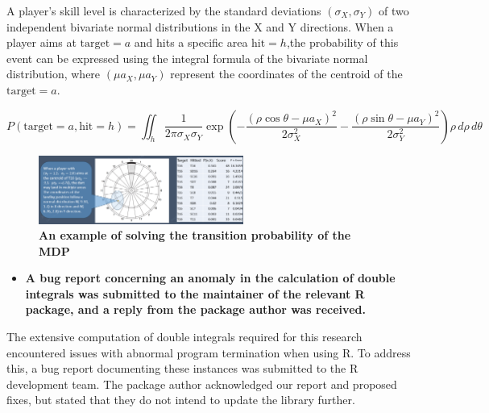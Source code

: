 \documentclass[cjjs]{ipart}
\theoremstyle{plain}
\begin{document}
\text A player's skill level is characterized by the standard deviations
$(\sigma_X, \sigma_Y)$ of two independent bivariate normal distributions in the X and Y directions. When a player aims at ${\text{target}} = a$ and hits a specific area $\text{hit} = h$,the probability of this event can be expressed using the integral formula of the bivariate normal distribution, where $(\mu a_X, \mu a_Y)$ represent the coordinates of the centroid of the $\text{target} = a$.

$$P(\text{target} = a, \text{hit} = h) = \iint_h \frac{1}{2 \pi \sigma_X \sigma_Y} \exp\left( - \frac{(\rho \cos \theta - \mu a_X)^2}{2 \sigma_X^2} - \frac{(\rho \sin \theta - \mu a_Y)^2}{2 \sigma_Y^2} \right) \rho \, d\rho \, d\theta$$

\begin{figure}[H]
    \centering
    \includegraphics[width=0.60\textwidth]{10.png} 
    \caption{\textbf{An example of solving the transition probability
of the MDP}}
    \label{fig:dartboard}
\end{figure}

\begin{itemize}
    \item \textbf{A bug report concerning an anomaly in the calculation of double integrals was submitted to the maintainer of the relevant R package, and a reply from the package author was received.}
\end{itemize}

\text The extensive computation of double integrals required for this research encountered issues with abnormal program termination when using R. To address this, a bug report documenting these instances was submitted to the R development team. The package author acknowledged our report and proposed fixes, but stated that they do not intend to update the library further.
\end{document}
